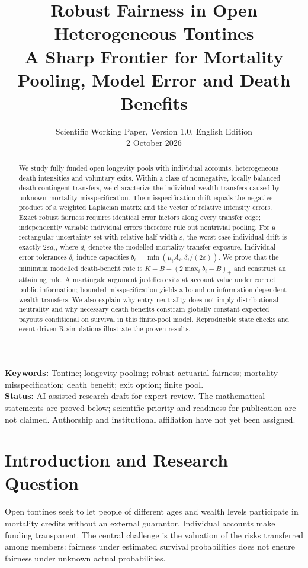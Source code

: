 \documentclass[11pt,a4paper]{article}
\title{Robust Fairness in Open Heterogeneous Tontines\\[5pt]
\large A Sharp Frontier for Mortality Pooling, Model Error and Death Benefits}
\author{}
\date{Scientific Working Paper, Version 1.0, English Edition\\2 October 2026}
\theoremstyle{definition}\newtheorem{definition}[theorem]{Definition}
\theoremstyle{remark}\newtheorem{remark}[theorem]{Remark}
\begin{document}
\maketitle
\begin{abstract}
We study fully funded open longevity pools with individual accounts, heterogeneous death intensities and voluntary exits. Within a class of nonnegative, locally balanced death-contingent transfers, we characterize the individual wealth transfers caused by unknown mortality misspecification. The misspecification drift equals the negative product of a weighted Laplacian matrix and the vector of relative intensity errors. Exact robust fairness requires identical error factors along every transfer edge; independently variable individual errors therefore rule out nontrivial pooling. For a rectangular uncertainty set with relative half-width $\varepsilon$, the worst-case individual drift is exactly $2\varepsilon d_i$, where $d_i$ denotes the modelled mortality-transfer exposure. Individual error tolerances $\delta_i$ induce capacities $b_i=\min(\mu_iA_i,\delta_i/(2\varepsilon))$. We prove that the minimum modelled death-benefit rate is $K-B+(2\max_i b_i-B)_+$ and construct an attaining rule. A martingale argument justifies exits at account value under correct public information; bounded misspecification yields a bound on information-dependent wealth transfers. We also explain why entry neutrality does not imply distributional neutrality and why necessary death benefits constrain globally constant expected payouts conditional on survival in this finite-pool model. Reproducible state checks and event-driven R simulations illustrate the proven results.
\end{abstract}
\noindent\textbf{Keywords:} Tontine; longevity pooling; robust actuarial fairness; mortality misspecification; death benefit; exit option; finite pool.\\
\textbf{Status:} AI-assisted research draft for expert review. The mathematical statements are proved below; scientific priority and readiness for publication are not claimed. Authorship and institutional affiliation have not yet been assigned.

\section{Introduction and Research Question}
Open tontines seek to let people of different ages and wealth levels participate in mortality credits without an external guarantor. Individual accounts make funding transparent. The central challenge is the valuation of the risks transferred among members: fairness under estimated survival probabilities does not ensure fairness under unknown actual probabilities.
\end{document}
